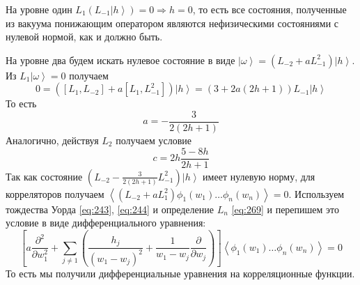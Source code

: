 \documentclass[a4paper,12pt]{article}
\theoremstyle{definition}
\theoremstyle{definition}
\theoremstyle{definition}
\begin{document}
На уровне один  $L_{1}\left(L_{-1}\left|h\right>\right)=0\Longrightarrow h=0$, то есть все состояния, полученные из вакуума понижающим оператором являются нефизическими состояниями с нулевой нормой, как и должно быть. 

На уровне два будем искать нулевое состояние в виде $\left|\omega\right>=(L_{-2}+a L_{-1}^{2})\left| h \right> $. Из $L_{1}\left|\omega\right>=0$ получаем
\begin{equation}
  \label{eq:310}
  0=([L_{1},L_{-2}] +a [L_{1},L_{-1}^{2}])\left|h\right> = (3+2a(2h+1))L_{-1}\left|h\right>
\end{equation}
То есть
\begin{equation}
  \label{eq:311}
  a=-\frac{3}{2(2h+1)}
\end{equation}
Аналогично, действуя $L_{2}$ получаем условие
\begin{equation}
  \label{eq:312}
  c=2h\frac{5-8h}{2h+1}
\end{equation}
Так как состояние $(L_{-2}-\frac{3}{2(2h+1)} L_{-1}^{2})\left|h\right>$ имеет нулевую норму, для корреляторов получаем $\left<(L_{-2}+aL_{1}^{2})\phi_{1}(w_{1}) \dots \phi_{n}(w_{n}) \right>=0$. 
Используем тождества Уорда \eqref{eq:243}, \eqref{eq:244} и определение $L_{n}$ \eqref{eq:269} и перепишем это условие в виде дифференциального уравнения:
\begin{equation}
  \label{eq:313}
\left[  a \frac{\partial^{2}}{\partial w_{1}^{2}} +\sum_{j\neq 1} \left(\frac{h_{j}}{(w_{1}-w_{j})^{2}}+\frac{1}{w_{1}-w_{j}} \frac{\partial}{\partial w_{j}}\right)\right] \left< \phi_{1}(w_{1}) \dots \phi_{n}(w_{n}) \right> =0
\end{equation}
То есть мы получили дифференциальные уравнения на корреляционные функции. 
\end{document}
